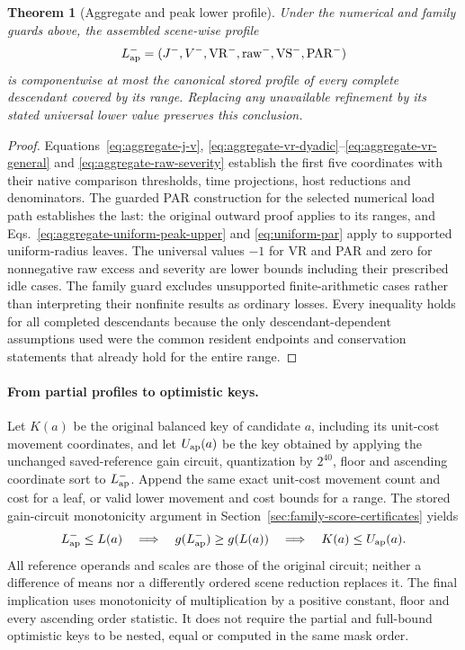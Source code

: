 \documentclass[11pt]{article}
\newtheorem{theorem}{Theorem}
\begin{document}
\begin{theorem}[Aggregate and peak lower profile]\label{thm:aggregate-peak-profile}
Under the numerical and family guards above, the assembled scene-wise profile
\begin{equation}
L_{\rm ap}^-=(J^-,V^-,\mathrm{VR}^-,\mathrm{raw}^-,\mathrm{VS}^-,\mathrm{PAR}^-)
\end{equation}
is componentwise at most the canonical stored profile of every complete descendant covered by its range. Replacing any unavailable refinement by its stated universal lower value preserves this conclusion.
\end{theorem}
\begin{proof}
Equations~\eqref{eq:aggregate-j-v}, \eqref{eq:aggregate-vr-dyadic}--\eqref{eq:aggregate-vr-general} and \eqref{eq:aggregate-raw-severity} establish the first five coordinates with their native comparison thresholds, time projections, host reductions and denominators. The guarded PAR construction for the selected numerical load path establishes the last: the original outward proof applies to its ranges, and Eqs.~\eqref{eq:aggregate-uniform-peak-upper} and \eqref{eq:uniform-par} apply to supported uniform-radius leaves. The universal values $-1$ for VR and PAR and zero for nonnegative raw excess and severity are lower bounds including their prescribed idle cases. The family guard excludes unsupported finite-arithmetic cases rather than interpreting their nonfinite results as ordinary losses. Every inequality holds for all completed descendants because the only descendant-dependent assumptions used were the common resident endpoints and conservation statements that already hold for the entire range.
\end{proof}

\paragraph{From partial profiles to optimistic keys.}
Let $K(a)$ be the original balanced key of candidate $a$, including its unit-cost movement coordinates, and let $U_{\rm ap}(a)$ be the key obtained by applying the unchanged saved-reference gain circuit, quantization by $2^{40}$, floor and ascending coordinate sort to $L_{\rm ap}^-$. Append the same exact unit-cost movement count and cost for a leaf, or valid lower movement and cost bounds for a range. The stored gain-circuit monotonicity argument in Section~\ref{sec:family-score-certificates} yields
\begin{equation}
L_{\rm ap}^-\le L(a)
\quad\Longrightarrow\quad
g(L_{\rm ap}^-)\ge g(L(a))
\quad\Longrightarrow\quad
K(a)\le U_{\rm ap}(a).
\label{eq:aggregate-key-domination}
\end{equation}
All reference operands and scales are those of the original circuit; neither a difference of means nor a differently ordered scene reduction replaces it. The final implication uses monotonicity of multiplication by a positive constant, floor and every ascending order statistic. It does not require the partial and full-bound optimistic keys to be nested, equal or computed in the same mask order.
\end{document}
